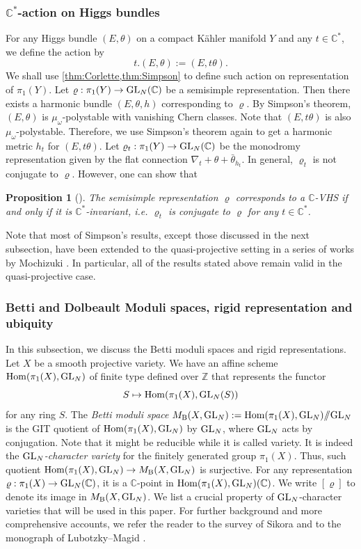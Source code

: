 \documentclass[english]{amsproc}
\theoremstyle{plain}
\newtheorem{proposition}[thm]{Proposition}
\theoremstyle{definition}
\theoremstyle{remark}
\theoremstyle{plain}
\numberwithin{equation}{thm} %
\newcommand{\bC}{\mathbb{C}}
\newcommand{\bZ}{\mathbb{Z}}
\newcommand{\Hom}{{\rm Hom}}
\newcommand{\GL}{{\rm GL}}
\begin{document}
\subsubsection{$\bC^*$-action on Higgs bundles}
For any Higgs bundle $(E,\theta)$ on a compact K\"ahler manifold $Y$ and any $t\in\bC^*$, we define the action by
$$
t.(E,\theta):=(E,t\theta).
$$
We shall use \cref{thm:Corlette,thm:Simpson} to define such action on representation of $\pi_1(Y)$. Let $\varrho:\pi_1(Y)\to\GL_N(\bC)$ be a semisimple representation. Then there exists a harmonic bundle $(E,\theta,h)$ corresponding to $\varrho$. By Simpson's theorem, $(E,\theta)$ is $\mu_\omega$-polystable with vanishing Chern classes. Note that $(E,t\theta)$ is also $\mu_\omega$-polystable. Therefore, we use Simpson's theorem again to get a harmonic metric $h_t$ for $(E,t\theta)$. Let $\varrho_t:\pi_1(Y)\to\GL_N(\bC)$ be the monodromy representation given by the flat connection $\nabla_t+\theta+\bar{\theta}_{h_t}$.  In general,  $\varrho_t$ is not conjugate to $\varrho$. 
However, one can show that
\begin{proposition}[\cite{Sim92}]
	The semisimple representation $\varrho$ corresponds to a $\bC$-VHS if and only if it is $\bC^*$-invariant, i.e. $\varrho_t$ is conjugate to $\varrho$ for any $t\in \bC^*$. 
\end{proposition}


Note that most of Simpson's results, except those discussed in the next subsection,  have been extended to the quasi-projective setting in a series of works by 
Mochizuki \cite{Moc06,Moc07,Moc07b}. In particular, all of the results stated above 
remain valid in the quasi-projective case.
\subsubsection{Betti and Dolbeault Moduli spaces, rigid representation and ubiquity}  
In this subsection, we discuss the Betti moduli spaces  and rigid representations. Let $X$ be a  smooth projective variety. 
We have an affine scheme $\Hom(\pi_1(X), \GL_N)$ of finite type defined over $\bZ$ that represents the functor
$$
S\mapsto \Hom(\pi_1(X), \GL_N(S))
$$
for any ring $S$.  
The \emph{Betti moduli space} $M_{\rm B}(X,\GL_N):=\Hom(\pi_1(X), \GL_N)\slash\!\!\slash \GL_{N}$ is the GIT quotient of $\Hom(\pi_1(X), \GL_N)$ by $\GL_N$, where $\GL_{N}$ acts by conjugation.  Note that it might be reducible while it is called variety. It is indeed the  \emph{$\GL_{N}$-character variety}  for the finitely generated group $\pi_1(X)$.      Thus,  such quotient $\Hom(\pi_1(X), \GL_N)\to M_{\rm B}(X,\GL_N)$ is surjective.  For any representation $\varrho:\pi_1(X)\to \GL_N(\bC)$, it is a $\bC$-point in $\Hom(\pi_1(X), \GL_N)(\bC)$. We write $[\varrho]$ to denote  its image in $M_{\rm B}(X,\GL_{N})$.  We list a  crucial property  of  $\GL_{N}$-character   varieties that will be used in this paper. For further background and more comprehensive accounts, we refer the reader to the survey of Sikora \cite{Sik12} and to the monograph of Lubotzky–Magid \cite{LM85}.
\end{document}
